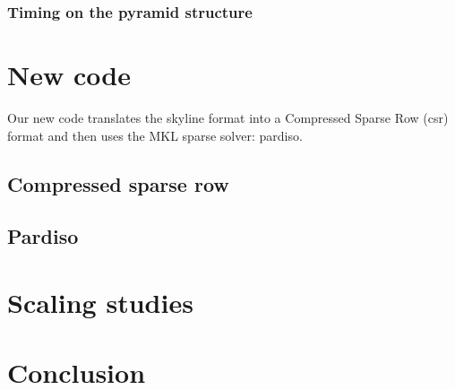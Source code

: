 \documentclass[11pt]{article}
\begin{document}
\subsubsection{Timing on the pyramid structure}

\section{New code}
Our new code translates the skyline format into a Compressed Sparse Row (csr) format and then uses the MKL sparse solver: pardiso.

\subsection{Compressed sparse row}

\subsection{Pardiso}


\section{Scaling studies}

\section{Conclusion}
\end{document}
